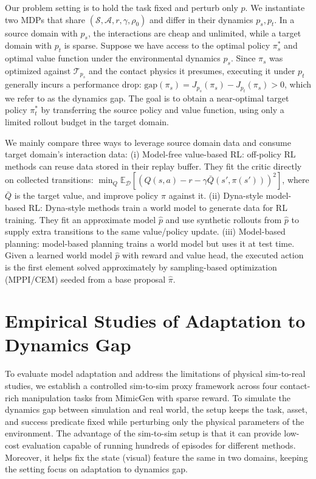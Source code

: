 \documentclass{article} %
\begin{document}
Our problem setting is to hold the task fixed and perturb only $p$. We instantiate two MDPs that share $(\mathcal{S}, \mathcal{A}, r, \gamma,
\rho_0)$ and differ in their dynamics $p_s, p_t$. In a source domain with $p_s$, the interactions are cheap and unlimited, while a target domain with $p_t$ is sparse. Suppose we have access to the optimal policy $\pi_s^*$ and optimal value function under the environmental dynamics $p_s$. Since $\pi_s$ was optimized against $\mathcal{T}_{p_s}$ and the contact physics it presumes, executing it under $p_t$ generally incurs a performance drop: $\mathrm{gap}(\pi_s) = J_{p_s}(\pi_s) - J_{p_t}(\pi_s) > 0$, which we refer to as the dynamics gap. The goal is to obtain a near-optimal target policy $\pi^*_t$ by transferring the source policy and value function, using only a limited rollout budget in the target domain.

We mainly compare three ways to leverage source domain data and consume target domain's interaction data: (i) Model-free value-based RL: off-policy RL methods can reuse data stored in their replay buffer. They fit the critic directly on collected transitions: $\min_{Q} \mathbb{E}_{\mathcal{D}} [ (Q(s,a) - r - \gamma \bar{Q}(s', \pi(s')))^2]$, where $\bar{Q}$ is the target value, and improve policy $\pi$ against it. (ii) Dyna-style model-based RL: Dyna-style methods train a world model to generate data for RL training. They fit an approximate model $\hat{p}$ and use synthetic rollouts from $\hat{p}$ to supply extra transitions to the same value/policy update. (iii) Model-based planning: model-based planning trains a world model but uses it at test time. Given a learned world model $\hat{p}$ with reward and value head, the executed action is the first element solved approximately by sampling-based optimization (MPPI/CEM) seeded from a base proposal $\hat{\pi}$.

\section{Empirical Studies of Adaptation to Dynamics Gap}
\label{empirical}

To evaluate model adaptation and address the limitations of physical sim-to-real studies, we establish a controlled sim-to-sim proxy framework across four contact-rich manipulation tasks from MimicGen \citep{zhu2020robosuite, robomimic2021, pmlr-v229-mandlekar23a} with sparse reward. To simulate the dynamics gap between simulation and real world, the setup keeps the task, asset, and success predicate fixed while perturbing only the physical parameters of the environment. The advantage of the sim-to-sim setup is that it can provide low-cost evaluation capable of running hundreds of episodes for different methods. Moreover, it helps fix the state (visual) feature the same in two domains, keeping the setting focus on adaptation to dynamics gap.
\end{document}
